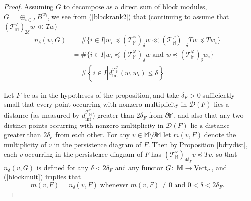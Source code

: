 \documentclass[11pt]{amsart}
\theoremstyle{definition}
\theoremstyle{remark}
\numberwithin{equation}{section}
\def\co{\colon\thinspace}
\begin{document}
\begin{proof}
	Assuming $G$ to decompose as a direct sum of block modules, $G=\oplus_{i\in I}B^{w_i}$, we see from (\ref{blockrank2}) that (continuing to assume that $(\mathcal{T}_{\mathbb{M}}^{\varphi})_{2\delta}w\ll Tw$) \begin{align}\nonumber n_{\delta}(w,G)&=\#\{i\in I|w_i\preceq (\mathcal{T}^{\varphi}_{\mathbb{M}})_{\delta}w\ll (\mathcal{T}^{\varphi}_{\mathbb{M}})_{-\delta}Tw\preceq Tw_i \}\\  \nonumber &= \#\{i\in I| w_i\preceq (\mathcal{T}^{\varphi}_{\mathbb{M}})_{\delta}w\mbox{ and }w\preceq (\mathcal{T}^{\varphi}_{\mathbb{M}})_{\delta}w_i\} \\&= \#\left\{i\in I\left|d_{\mathrm{int}}^{\mathcal{T}_{\mathbb{M}}^{\varphi}}(w,w_i) \leq \delta  \right.\right\}\label{blockmult} \end{align}
	
	Let $F$ be as in the hypotheses of the proposition, and take $\delta_F>0$ sufficiently small that every point occurring with nonzero multiplicity in $\mathcal{D}(F)$ lies a distance (as measured by $d_{\mathrm{int}}^{\mathcal{T}_{\mathbb{M}}^{\varphi}}$) greater than $2\delta_F$ from $\partial\mathbb{M}$, and also that any two distinct points occurring with nonzero multiplicity in $\mathcal{D}(F)$ lie a distance greater than $2\delta_F$ from each other.  For any $v\in\mathbb{M}\setminus\partial\mathbb{M}$ let $m(v,F)$ denote the multiplicity of $v$ in the persistence diagram of $F$.  Then by Proposition \ref{bdrydist}, each $v$ occurring in the persistence diagram of $F$ has $(\mathcal{T}_{\mathbb{M}}^{\varphi})_{4\delta_F}v\preceq Tv$, so that $n_{\delta}(v,G)$ is defined for any $\delta<2\delta_F$ and any functor $G\co\mathbb{M}\to \mathrm{Vect}_{\kappa}$, and  (\ref{blockmult}) implies that \[ m(v,F)=n_{\delta}(v,F)\mbox{ whenever } m(v,F)\neq 0\mbox{ and }0<\delta<2\delta_F.  \]
	

\end{proof}
\end{document}
